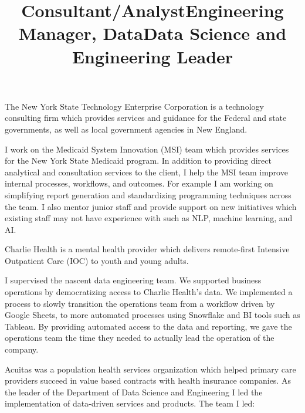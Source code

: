 \documentclass[line, mm, 10pt]{res}
\begin{document}
\begin{resume}
  \title{Consultant/Analyst}
  \begin{position}
    The New York State Technology Enterprise Corporation is a technology
    consulting firm which provides services and guidance for the Federal and
    state governments, as well as local government agencies in New England.

    I work on the Medicaid System Innovation (MSI) team which provides services
    for the New York State Medicaid program. In addition to providing direct
    analytical and consultation services to the client, I help the MSI team
    improve internal processes, workflows, and outcomes. For example I am
    working on simplifying report generation and standardizing programming
    techniques across the team. I also mentor junior staff and provide support
    on new initiatives which existing staff may not have experience with such as
    NLP, machine learning, and AI.
  \end{position}

  \title{Engineering Manager, Data}
  \begin{position}
    Charlie Health is a mental health provider which delivers
    remote-first Intensive Outpatient Care (IOC) to youth and young adults. 
    
    I supervised the nascent data engineering team. We supported business
    operations by democratizing access to Charlie Health's data. We implemented
    a process to slowly transition the operations team from a workflow driven by
    Google Sheets, to more automated processes using Snowflake and BI tools such
    as Tableau. By providing automated access to the data and reporting, we gave
    the operations team the time they needed to actually lead the operation of
    the company. 
  \end{position}

  \title{Data Science and Engineering Leader}
  \begin{position}
    Acuitas was a population health services organization which helped primary
    care providers succeed in value based contracts with health insurance
    companies. As the leader of the Department of Data Science and Engineering I
    led the implementation of data-driven services and products. The team I led:
    

\end{position}
\end{resume}
\end{document}
